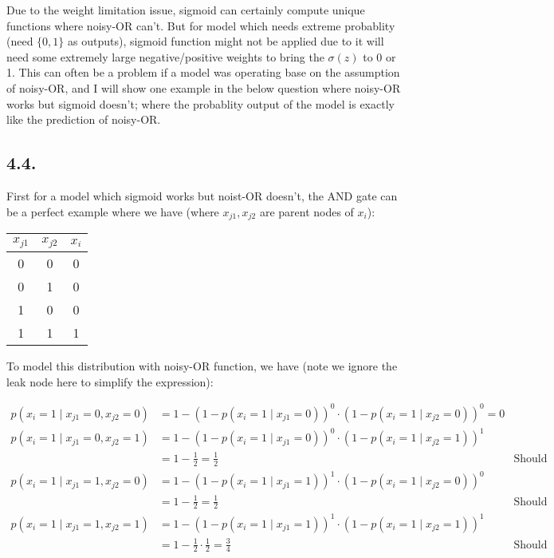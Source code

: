 \documentclass[11pt]{article}
\begin{document}
Due to the weight limitation issue, sigmoid can certainly compute unique functions where noisy-OR can't. But for model which needs extreme probablity (need $\{0, 1 \}$ as outputs), sigmoid function might not be applied due to it will need some extremely large negative/positive weights to bring the $\sigma(z)$ to 0 or 1. This can often be a problem if a model was operating base on the assumption of noisy-OR, and I will show one example in the below question where noisy-OR works but sigmoid doesn't; where the probablity output of the model is exactly like the prediction of noisy-OR.


\subsection*{4.4.}

First for a model which sigmoid works but noist-OR doesn't, the AND gate can be a perfect example where we have (where $x_{j1}, x_{j2}$ are parent nodes of $x_i$):

\begin{table}[H]
    \centering
    \begin{tabular}{ c  c | c }
        \hline
        $x_{j1}$ & $x_{j2}$ & $x_i$ \\
        \hline
        0 & 0 & 0 \\
        0 & 1 & 0 \\
        1 & 0 & 0 \\
        1 & 1 & 1
    \end{tabular}
\end{table}

To model this distribution with noisy-OR function, we have (note we ignore the leak node here to simplify the expression):

\begin{align*}
    p(x_i = 1 \mid x_{j1} = 0, x_{j2} = 0) &= 1 - (1 - p(x_i = 1 \mid x_{j1} = 0))^{0} \cdot (1 - p(x_i = 1 \mid x_{j2} = 0))^{0} = 0 \\
    p(x_i = 1 \mid x_{j1} = 0, x_{j2} = 1) &= 1 - (1 - p(x_i = 1 \mid x_{j1} = 0))^{0} \cdot (1 - p(x_i = 1 \mid x_{j2} = 1))^{1}\\ &= 1 - \frac{1}{2}= \frac{1}{2} & \text{Should be 0}\\
    p(x_i = 1 \mid x_{j1} = 1, x_{j2} = 0) &= 1 - (1 - p(x_i = 1 \mid x_{j1} = 1))^{1} \cdot (1 - p(x_i = 1 \mid x_{j2} = 0))^{0} \\ &= 1 - \frac{1}{2}= \frac{1}{2} & \text{Should be 0}\\
    p(x_i = 1 \mid x_{j1} = 1, x_{j2} = 1) &= 1 - (1 - p(x_i = 1 \mid x_{j1} = 1))^{1} \cdot (1 - p(x_i = 1 \mid x_{j2} = 1))^{1} \\ &= 1 - \frac{1}{2} \cdot \frac{1}{2}= \frac{3}{4} & \text{Should be 1}    %
\end{align*}
\end{document}
